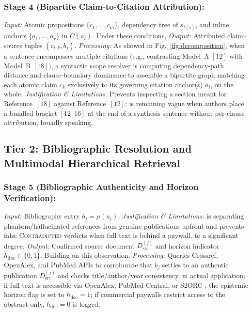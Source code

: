 \documentclass[journal]{IEEEtran}
\begin{document}
\subsubsection{Stage 4 (Bipartite Claim-to-Citation Attribution):}
\emph{Input:} Atomic propositions $\{c_1, \dots, c_m\}$, dependency tree of $s_{t(i)}$, and inline anchors $\{a_1, \dots, a_r\}$ in $C(a_i)$. Under these conditions, \emph{Output:} Attributed claim--source tuples $(c_{i,k}, b_j)$. \emph{Processing:} As showed in Fig.~\ref{fig:decomposition}, when a sentence encompasses multiple citations (e.g., contrasting Model~A $[12]$ with Model~B $[18]$), a syntactic scope resolver is computing dependency-path distance and clause-boundary dominance to assemble a bipartite graph matching each atomic claim $c_k$ exclusively to its governing citation anchor(s) $a_i$, on the whole. \emph{Justification \& Limitations:} Prevents inspecting a section meant for Reference~$[18]$ against Reference~$[12]$; is remaining vague when authors place a bundled bracket $[12\text{--}16]$ at the end of a synthesis sentence without per-clause attribution, broadly speaking.

\subsection{Tier 2: Bibliographic Resolution and Multimodal Hierarchical Retrieval}
\subsubsection{Stage 5 (Bibliographic Authenticity and Horizon Verification):}
\emph{Input:} Bibliography entry $b_j = \mu(a_i)$. \emph{Justification \& Limitations:} is separating phantom/hallucinated references from genuine publications upfront and prevents false \textsc{Contradicted} verdicts when full text is behind a paywall, to a significant degree. \emph{Output:} Confirmed source document $D_{\text{src}}^{(j)}$ and horizon indicator $h_{\text{doc}} \in \{0, 1\}$. Building on this observation, \emph{Processing:} Queries Crossref, OpenAlex, and PubMed APIs to corroborate that $b_j$ settles to an authentic publication $D_{\text{src}}^{(j)}$ and checks title/author/year consistency, in actual application; if full text is accessible via OpenAlex, PubMed Central, or S2ORC \cite{lo2020s2orc}, the epistemic horizon flag is set to $h_{\text{doc}} = 1$; if commercial paywalls \cite{lariviere2015oligopoly} restrict access to the abstract only, $h_{\text{doc}} = 0$ is logged.
\end{document}

